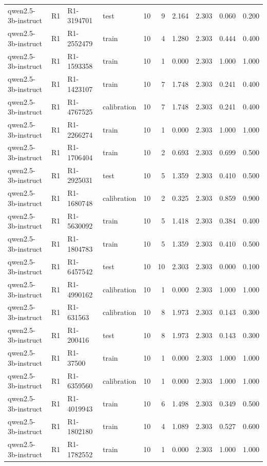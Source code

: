 \begin{table}
\begin{tabular}{llllrrrrrr}
qwen2.5-3b-instruct & R1 & R1-3194701 & test & 10 & 9 & 2.164 & 2.303 & 0.060 & 0.200 \\
qwen2.5-3b-instruct & R1 & R1-2552479 & train & 10 & 4 & 1.280 & 2.303 & 0.444 & 0.400 \\
qwen2.5-3b-instruct & R1 & R1-1593358 & train & 10 & 1 & 0.000 & 2.303 & 1.000 & 1.000 \\
qwen2.5-3b-instruct & R1 & R1-1423107 & train & 10 & 7 & 1.748 & 2.303 & 0.241 & 0.400 \\
qwen2.5-3b-instruct & R1 & R1-4767525 & calibration & 10 & 7 & 1.748 & 2.303 & 0.241 & 0.400 \\
qwen2.5-3b-instruct & R1 & R1-2266274 & train & 10 & 1 & 0.000 & 2.303 & 1.000 & 1.000 \\
qwen2.5-3b-instruct & R1 & R1-1706404 & train & 10 & 2 & 0.693 & 2.303 & 0.699 & 0.500 \\
qwen2.5-3b-instruct & R1 & R1-2925031 & test & 10 & 5 & 1.359 & 2.303 & 0.410 & 0.500 \\
qwen2.5-3b-instruct & R1 & R1-1680748 & calibration & 10 & 2 & 0.325 & 2.303 & 0.859 & 0.900 \\
qwen2.5-3b-instruct & R1 & R1-5630092 & train & 10 & 5 & 1.418 & 2.303 & 0.384 & 0.400 \\
qwen2.5-3b-instruct & R1 & R1-1804783 & train & 10 & 5 & 1.359 & 2.303 & 0.410 & 0.500 \\
qwen2.5-3b-instruct & R1 & R1-6457542 & test & 10 & 10 & 2.303 & 2.303 & 0.000 & 0.100 \\
qwen2.5-3b-instruct & R1 & R1-4990162 & calibration & 10 & 1 & 0.000 & 2.303 & 1.000 & 1.000 \\
qwen2.5-3b-instruct & R1 & R1-631563 & calibration & 10 & 8 & 1.973 & 2.303 & 0.143 & 0.300 \\
qwen2.5-3b-instruct & R1 & R1-200416 & test & 10 & 8 & 1.973 & 2.303 & 0.143 & 0.300 \\
qwen2.5-3b-instruct & R1 & R1-37500 & train & 10 & 1 & 0.000 & 2.303 & 1.000 & 1.000 \\
qwen2.5-3b-instruct & R1 & R1-6359560 & calibration & 10 & 1 & 0.000 & 2.303 & 1.000 & 1.000 \\
qwen2.5-3b-instruct & R1 & R1-4019943 & train & 10 & 6 & 1.498 & 2.303 & 0.349 & 0.500 \\
qwen2.5-3b-instruct & R1 & R1-1802180 & train & 10 & 4 & 1.089 & 2.303 & 0.527 & 0.600 \\
qwen2.5-3b-instruct & R1 & R1-1782552 & train & 10 & 1 & 0.000 & 2.303 & 1.000 & 1.000 \\

\end{tabular}
\end{table}
